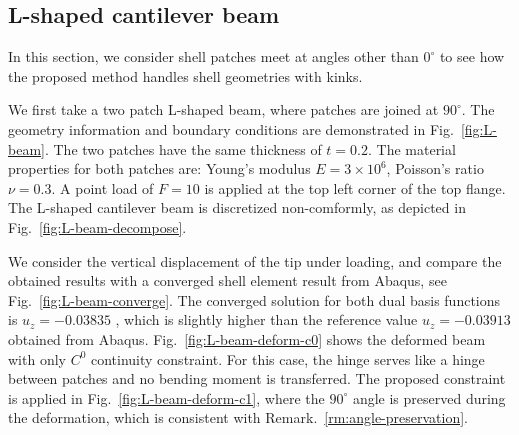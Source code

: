 \documentclass[preprint,12pt]{elsarticle}
\theoremstyle{remark}
\begin{document}
\subsection{L-shaped cantilever beam}
In this section, we consider shell patches meet at angles other than $0^{\circ}$ to see how the proposed method handles shell geometries with kinks. \par

We first take a two patch L-shaped beam, where patches are joined at $90^{\circ}$. The geometry information and boundary conditions are demonstrated in Fig.~\ref{fig:L-beam}. The two patches have the same thickness of $t = 0.2$. The material properties for both patches are: Young’s modulus $E = 3\times10^6$, Poisson's ratio $\nu = 0.3$. A point load of $F=10$ is applied at the top left corner of the top flange. The L-shaped cantilever beam is discretized non-comformly, as depicted in Fig.~\ref{fig:L-beam-decompose}.\par

We consider the vertical displacement of the tip under loading, and compare the obtained results with a converged shell element result from Abaqus, see Fig.~\ref{fig:L-beam-converge}. The converged solution for both dual basis functions is $u_z = -0.03835$ , which is slightly higher than the reference value $u_z = -0.03913$ obtained from Abaqus. Fig.~\ref{fig:L-beam-deform-c0} shows the deformed beam with only $C^0$ continuity constraint. For this case, the hinge serves like a hinge between patches and no bending moment is transferred. The proposed constraint is applied in Fig.~\ref{fig:L-beam-deform-c1}, where the $90^{\circ}$ angle is preserved during the deformation, which is consistent with Remark.~\ref{rm:angle-preservation}. \par
\end{document}
